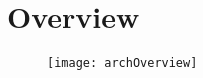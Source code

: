 
\chapter{\vc{} Overview} %

\label{AppendixC} %

\begin{figure}[!htbp]
	\centering
	\texttt{[image: archOverview]}
\end{figure}
